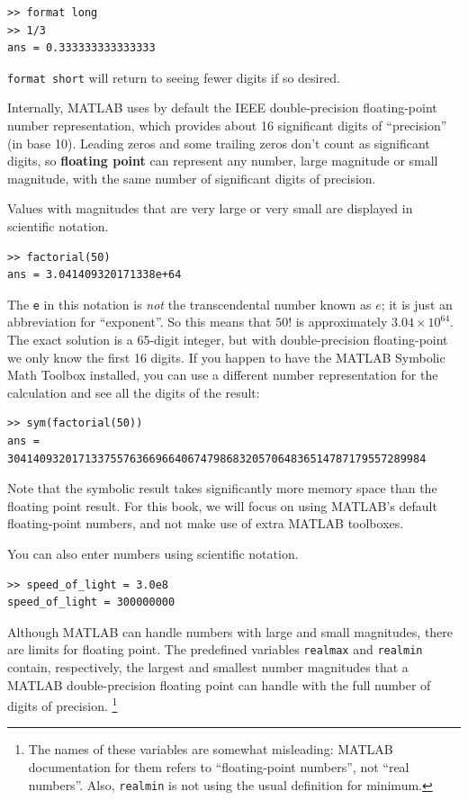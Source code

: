 \documentclass[
]{book}
\begin{document}
\begin{verbatim}
>> format long
>> 1/3
ans = 0.333333333333333
\end{verbatim}

{\tt format short} will return to seeing fewer digits if so desired.

Internally, MATLAB uses by default the IEEE double-precision floating-point
number representation, which provides about 16 significant digits of ``precision'' (in
base 10).
Leading zeros and some trailing zeros don't count as significant
digits, so {\bf floating point} can represent any number, large magnitude or small magnitude,
with the same number of significant digits of precision.

Values with magnitudes that are very large or very small are displayed in 
scientific notation.

\begin{verbatim}
>> factorial(50)
ans = 3.041409320171338e+64
\end{verbatim}

The {\tt e} in this notation is {\em not} the transcendental number
known as $e$; it is just an abbreviation for ``exponent''.  So
this means that $50!$ is approximately $3.04 \times 10^{64}$.  The
exact solution is a 65-digit integer, but with double-precision floating-point 
we only know the first 16
digits. 
If you happen to have the MATLAB Symbolic Math Toolbox installed, you can use a 
different number representation for the calculation and see all the digits of 
the result:

\begin{verbatim}
>> sym(factorial(50))
ans = 30414093201713375576366966406747986832057064836514787179557289984
\end{verbatim}

Note that the symbolic result takes significantly more memory space 
than the floating point result.
For this book, we will focus on using MATLAB's default floating-point 
numbers, and not make use of extra MATLAB toolboxes.

You can also enter numbers using scientific notation.

\begin{verbatim}
>> speed_of_light = 3.0e8
speed_of_light = 300000000
\end{verbatim}

Although MATLAB can handle numbers with large and small magnitudes, 
there are limits for floating point.  The
predefined variables {\tt realmax} and {\tt realmin}
 contain, respectively, the
largest and smallest number magnitudes that a MATLAB double-precision 
floating point can handle with the full number of digits of precision.
\footnote{The names of these variables are somewhat misleading: MATLAB
documentation for them refers to ``floating-point numbers'', not ``real
numbers''.  Also, {\tt realmin} is not using the usual definition 
for minimum.}
\end{document}
